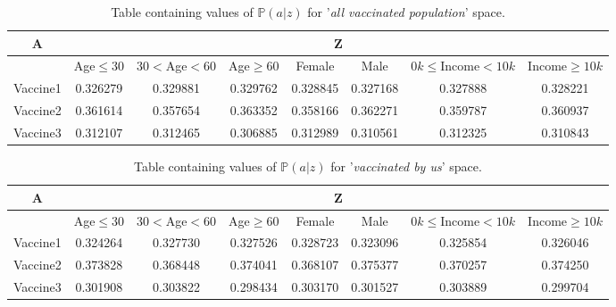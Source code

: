 \documentclass{article}
\begin{document}
\begin{center}
\begin{table}[H]
\begin{adjustbox}{max width=\textwidth}
\begin{tabular}{ |c| c c c c c c c| }
\hline
A  & \multicolumn{7}{c|}{Z} \\
\hline
  & Age$\leq30$ &    $30<$Age$<60$ &     Age$\geq60$ &    Female &      Male &   $0k\leq$Income$<10k$ &    Income$\geq10k$ \\
\hline
 Vaccine1 &  0.326279 &  0.329881 &  0.329762 &  0.328845 &  0.327168 &  0.327888 &  0.328221 \\
 Vaccine2 &  0.361614 &  0.357654 &  0.363352 &  0.358166 &  0.362271 &  0.359787 &  0.360937 \\
 Vaccine3 &  0.312107 &  0.312465 &  0.306885 &  0.312989 &  0.310561 &  0.312325 &  0.310843 \\
 \hline
\end{tabular}
\end{adjustbox}
\caption{Table containing values of $\mathbb{P}(a|z)$ for '\textit{all vaccinated population}' space.}
\label{tab:1}
\end{table}
\end{center}

\begin{center}
\begin{table}[H]
\begin{adjustbox}{max width=\textwidth}
\begin{tabular}{ |c| c c c c c c c|}
\hline
A  & \multicolumn{7}{c|}{Z} \\
\hline
  & Age$\leq30$ &    $30<$Age$<60$ &     Age$\geq60$ &    Female &      Male &   $0k\leq$Income$<10k$ &    Income$\geq10k$ \\
\hline
 Vaccine1 &  0.324264 &  0.327730 &  0.327526 &  0.328723 &  0.323096 &  0.325854 &  0.326046 \\
 Vaccine2 &  0.373828 &  0.368448 &  0.374041 &  0.368107 &  0.375377 &  0.370257 &  0.374250 \\
Vaccine3 &  0.301908 &  0.303822 &  0.298434 &  0.303170 &  0.301527 &  0.303889 &  0.299704
  \\ \hline
\end{tabular}
\end{adjustbox}
\caption{Table containing values of $\mathbb{P}(a|z)$ for '\textit{vaccinated by us}' space.}
\label{tab:2}
\end{table}
\end{center}
\end{document}
